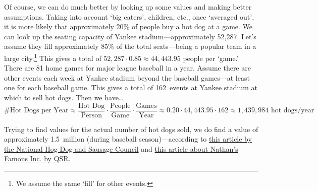 \documentclass[11pt,letterpaper]{article}
\begin{document}
Of course, we can do much better by looking up some values and making better assumptions. Taking into account `big eaters', children, etc., once `averaged out', it is more likely that approximately 20\% of people buy a hot dog at a game. We can look up the seating capacity of Yankee stadium---approximately 52,287. Let's assume they fill approximately 85\% of the total seats---being a popular team in a large city.\footnote{We assume the same `fill' for other events.} This gives a total of $52,\!287 \cdot 0.85 \approx 44,\!443.95$ people per `game.' There are 81 home games for major league baseball in a year. Assume there are other events each week at Yankee stadium beyond the baseball games---at least one for each baseball game. This gives a total of 162~events at Yankee stadium at which to sell hot dogs. Then we have\dots
	\[
	\text{\# Hot Dogs per Year} \approx \dfrac{\text{Hot Dog}}{\text{Person}} \cdot \dfrac{\text{People}}{\text{Game}} \cdot \dfrac{\text{Games}}{\text{Year}} \approx 0.20 \cdot 44,\!443.95 \cdot 162 \approx 1,\!439,\!984 \text{ hot dogs/year}
	\] \pspace

Trying to find values for the actual number of hot dogs sold, we do find a value of approximately 1.5~million (during baseball season)---according to \href{https://www.prnewswire.com/news-releases/hot-dog-data-shows-mlb-teams-that-sell-the-most-hot-dogs-win-the-most-games-301260502.html}{this article by the National Hog Dog and Sausage Council} and \href{https://www.qsrmagazine.com/news/nathans-famous-chosen-official-hot-dog-new-yankee-stadium}{this article about Nathan's Famous Inc. by QSR}. 
\end{document}
